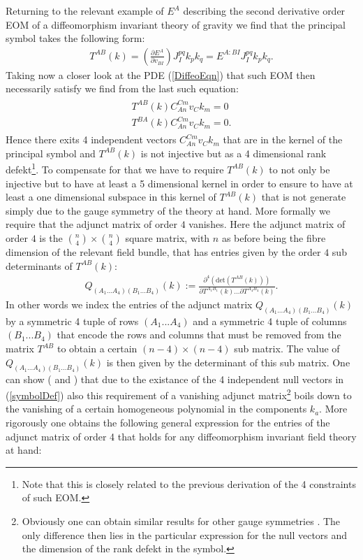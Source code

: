 \documentclass[a4paper,12pt, DIV=14, BCOR=5mm, twoside, headsepline]{scrbook}
\begin{document}
Returning to the relevant example of $E^A$ describing the second derivative order EOM of a diffeomorphism invariant theory of gravity we find that the principal symbol takes the following form:
\begin{align}
    T^{A B} (k) = \left (\frac{\partial E^A}{\partial v_{BI}} \right )J_I^{pq} k_p k_q = E^{A: BI} J_I^{pq} k_p k_q.
\end{align}
Taking now a closer look at the PDE (\ref{DiffeoEqn}) that such EOM then necessarily  satisfy we find from the last such equation:
\begin{align}\label{symbolDef}
\begin{aligned}
    T^{A B} (k) C_{An}^{Cm}v_Ck_m = 0 \\
    T^{B A} (k) C_{An}^{Cm}v_Ck_m = 0 .
\end{aligned}
\end{align}
Hence there exits 4 independent vectors $C_{An}^{Cm}v_Ck_m$ that are in the kernel of the principal symbol and $T^{AB}(k)$ is not injective but as a 4 dimensional rank defekt\footnote{Note that this is closely related to the previous derivation of the 4 constraints of such EOM.}. To compensate for that we have to require $T^{AB}(k)$ to not only be injective but to have at least a 5 dimensional kernel in order to ensure to have at least a one dimensional subspace in this kernel of $T^{AB}(k)$ that is not generate simply due to the gauge symmetry of the theory at hand. More formally we require that the adjunct matrix of order $4$ vanishes. Here the adjunct matrix of order $4$ is the $\binom{n}{4} \times \binom{n}{4}$ square matrix, with $n$ as before being the fibre dimension of the relevant field bundle, that has entries given by the order $4$ sub determinants of $T^{AB}(k)$:
\begin{align}\label{MinorDef}
    Q_{(A_1...A_4) (B_1...B_4)}(k) := \frac{\partial^4 (\mathrm{det}(T^{AB}(k)))}{\partial T^{A_1 B_1}(k) ... \partial T^{A_4 B_4}(k)}.
\end{align}
In other words we index the entries of the adjunct matrix $Q_{(A_1...A_4) (B_1...B_4)}(k)$ by a symmetric 4 tuple of rows $(A_1...A_4)$ and a symmetric 4 tuple of columns $(B_1...B_4)$ that encode the rows and columns that must be removed from the matrix $T^{AB}$ to obtain a certain $(n-4) \times (n-4)$ sub matrix. The value of $Q_{(A_1...A_4) (B_1...B_4)}(k)$ is then given by the determinant of this sub matrix. 
%
%
%
One can show (\cite{2018PhRvD..97h4036D} and \cite{2009JPhA...42U5402I}) that due to the existance of the 4 independent null vectors in (\ref{symbolDef}) also this requirement of a vanishing adjunct matrix\footnote{Obviously one can obtain similar results for other gauge symmetries \cite{2018PhRvD..97h4036D}. The only difference then lies in the particular expression for the null vectors and the dimension of the rank defekt in the symbol.} boils down to the vanishing of a certain homogeneous polynomial in the components $k_a$. More rigorously one obtains the following general expression for the entries of the adjunct matrix of order 4 that holds for any diffeomorphism invariant field theory at hand:
\end{document}
